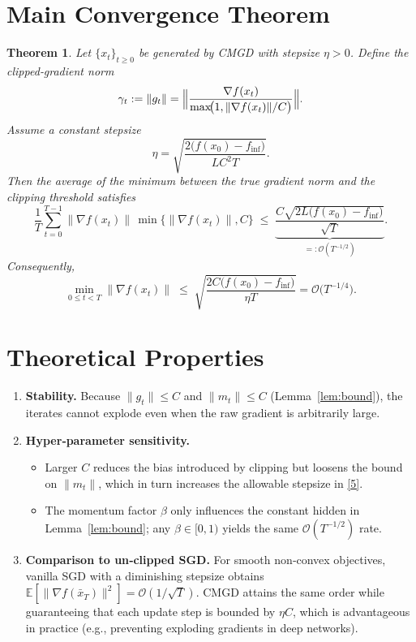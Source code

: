 \documentclass{article}
\newtheorem{theorem}{Theorem}
\newcommand{\EE}{\mathbb{E}}
\begin{document}
\section*{Main Convergence Theorem}
\begin{theorem}\label{thm:main}
Let $\{x_t\}_{t\ge0}$ be generated by CMGD with stepsize $\eta>0$.
Define the clipped‑gradient norm
\[
\gamma_t:=\|g_t\| = \Bigl\|\frac{\nabla f(x_t)}{\max\!\bigl(1,\|\nabla f(x_t)\|/C\bigr)}\Bigr\|.
\]
Assume a constant stepsize
\[
\eta = \sqrt{\frac{2\bigl(f(x_0)-f_{\inf}\bigr)}{L C^{2} T}} .
\tag{5}
\]
Then the average of the \emph{minimum} between the true gradient norm and the clipping threshold satisfies
\[
\frac{1}{T}\sum_{t=0}^{T-1}\bigl\|\nabla f(x_t)\bigr\|\,
\min\!\bigl\{\|\nabla f(x_t)\|,C\bigr\}
\;\le\;
\underbrace{ \frac{C\sqrt{2L\bigl(f(x_0)-f_{\inf}\bigr)}}{\sqrt{T}} }_{=: \mathcal{O}(T^{-1/2})}.
\tag{6}
\]
Consequently,
\[
\min_{0\le t<T}\bigl\|\nabla f(x_t)\bigr\|
\;\le\;
\sqrt{\frac{2C\bigl(f(x_0)-f_{\inf}\bigr)}{\eta T}} = \mathcal{O}\!\bigl(T^{-1/4}\bigr).
\]
\end{theorem}

\section*{Theoretical Properties}
\begin{enumerate}[label=\arabic*.]
\item \textbf{Stability.} Because $\|g_t\|\le C$ and $\|m_t\|\le C$ (Lemma~\ref{lem:bound}), the iterates cannot explode even when the raw gradient is arbitrarily large.
\item \textbf{Hyper‑parameter sensitivity.}
    \begin{itemize}
        \item Larger $C$ reduces the bias introduced by clipping but loosens the bound on $\|m_t\|$, which in turn increases the allowable stepsize in \eqref{5}.
        \item The momentum factor $\beta$ only influences the constant hidden in Lemma~\ref{lem:bound}; any $\beta\in[0,1)$ yields the same $\mathcal{O}(T^{-1/2})$ rate.
    \end{itemize}
\item \textbf{Comparison to un‑clipped SGD.} For smooth non‑convex objectives, vanilla SGD with a diminishing stepsize obtains $\EE[\|\nabla f(\bar x_T)\|^2]=\mathcal{O}(1/\sqrt{T})$. CMGD attains the same order while guaranteeing that each update step is bounded by $\eta C$, which is advantageous in practice (e.g., preventing exploding gradients in deep networks).
\end{enumerate}
\end{document}
